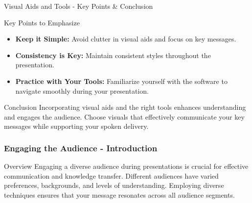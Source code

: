 \documentclass[aspectratio=169]{beamer}
\begin{document}
\begin{frame}[fragile]{Visual Aids and Tools - Key Points & Conclusion}
    \begin{block}{Key Points to Emphasize}
        \begin{itemize}
            \item \textbf{Keep it Simple:} Avoid clutter in visual aids and focus on key messages.
            \item \textbf{Consistency is Key:} Maintain consistent styles throughout the presentation.
            \item \textbf{Practice with Your Tools:} Familiarize yourself with the software to navigate smoothly during your presentation.
        \end{itemize}
    \end{block}
    
    \begin{block}{Conclusion}
        Incorporating visual aids and the right tools enhances understanding and engages the audience. Choose visuals that effectively communicate your key messages while supporting your spoken delivery.
    \end{block}
\end{frame}

\begin{frame}[fragile]
    \frametitle{Engaging the Audience - Introduction}
    \begin{block}{Overview}
        Engaging a diverse audience during presentations is crucial for effective communication and knowledge transfer. Different audiences have varied preferences, backgrounds, and levels of understanding. Employing diverse techniques ensures that your message resonates across all audience segments.
    \end{block}
\end{frame}
\end{document}
